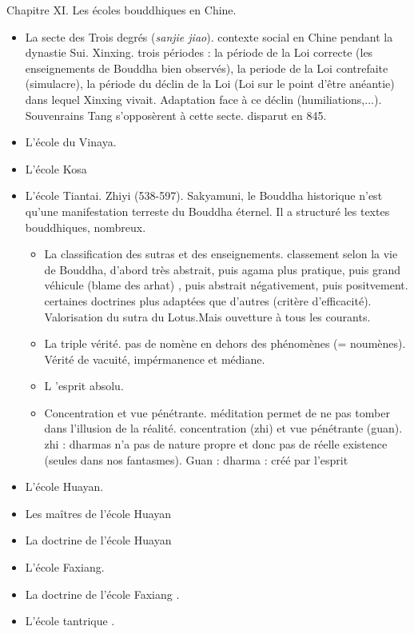 Chapitre XI. Les écoles bouddhiques en Chine.
\begin{itemize}
    \item La secte des Trois degrés (\textit{sanjie jiao}). contexte social en Chine pendant la dynastie Sui. Xinxing. trois périodes : la période de la Loi correcte (les enseignements de Bouddha bien observés), la periode de la Loi contrefaite (simulacre), la période du déclin de la Loi (Loi sur le point d'être anéantie) dans lequel Xinxing vivait. Adaptation face à ce déclin (humiliations,...). Souvenrains Tang s'opposèrent à cette secte. disparut en 845.
    \item L'école du Vinaya.
    \item L'école Kosa
    \item L'école Tiantai. Zhiyi (538-597). Sakyamuni, le Bouddha historique n'est qu'une manifestation terreste du Bouddha éternel. Il a structuré les textes bouddhiques, nombreux. 
    \begin{itemize}
           \item La classification des sutras et des enseignements. classement selon la vie de Bouddha, d'abord très abstrait, puis agama plus pratique, puis grand véhicule (blame des arhat) , puis abstrait négativement, puis positvement.  certaines doctrines plus adaptées que d'autres (critère d'efficacité). Valorisation du sutra du Lotus.Mais ouvetture à tous les courants. 
    \item La triple vérité. pas de nomène en dehors des phénomènes (= noumènes). Vérité de vacuité, impérmanence et médiane. 
    \item L 'esprit absolu.
    \item Concentration et vue pénétrante. méditation permet de ne pas tomber dans l'illusion de la réalité. concentration (zhi) et vue pénétrante (guan). zhi : dharmas n'a pas de nature propre et donc pas de réelle existence (seules dans nos fantasmes).  
    Guan : dharma : créé par l'esprit
    \end{itemize}

    \item L'école Huayan.
    \item Les maîtres de l'école Huayan
    \item La doctrine de l'école Huayan
    \item L'école Faxiang.
    \item La doctrine de l'école Faxiang .
    \item L'école tantrique .
\end{itemize}

